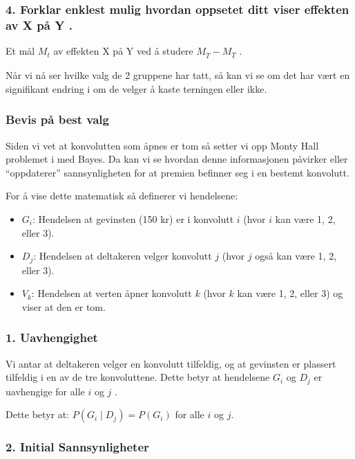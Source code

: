 \documentclass[
  12pt,
  a4paper,
  DIV=11,
  numbers=noendperiod]{scrartcl}
\begin{document}
\subsubsection{4. Forklar enklest mulig hvordan oppsetet ditt viser
effekten av X på Y
.}\label{forklar-enklest-mulig-hvordan-oppsetet-ditt-viser-effekten-av-x-puxe5-y-.}

Et mål \(M_t\) av effekten X på Y ved å studere
\(M_{\overline T} − M_{\underline T}\) .

Når vi nå ser hvilke valg de 2 gruppene har tatt, så kan vi se om det
har vært en signifikant endring i om de velger å kaste terningen eller
ikke.

\subsubsection{Bevis på best valg}\label{bevis-puxe5-best-valg}

Siden vi vet at konvolutten som åpnes er tom så setter vi opp Monty Hall
problemet i med Bayes. Da kan vi se hvordan denne informasjonen påvirker
eller ``oppdaterer'' sannsynligheten for at premien befinner seg i en
bestemt konvolutt.

For å vise dette matematisk så definerer vi hendelsene:

\begin{itemize}
\item
  \(G_i\): Hendelsen at gevinsten (150 kr) er i konvolutt \(i\) (hvor
  \(i\) kan være 1, 2, eller 3).
\item
  \(D_j\): Hendelsen at deltakeren velger konvolutt \(j\) (hvor \(j\)
  også kan være 1, 2, eller 3).
\item
  \(V_k\): Hendelsen at verten åpner konvolutt \(k\) (hvor \(k\) kan
  være 1, 2, eller 3) og viser at den er tom.
\end{itemize}

\subsubsection{1. Uavhengighet}\label{uavhengighet}

Vi antar at deltakeren velger en konvolutt tilfeldig, og at gevinsten er
plassert tilfeldig i en av de tre konvoluttene. Dette betyr at
hendelsene \(G_i\) og \(D_j\) er uavhengige for alle \(i\) og \(j\) .

Dette betyr at: \(P(G_i \mid D_j) = P(G_i)\) for alle \(i\) og \(j\).

\subsubsection{2. Initial
Sannsynligheter}\label{initial-sannsynligheter}
\end{document}
